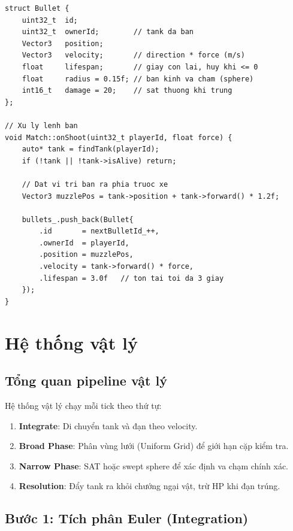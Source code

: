 \documentclass[12pt,a4paper]{report}
\begin{document}
\begin{lstlisting}[style=cppStyle, caption={Bullet entity và khởi tạo khi bắn}, label={lst:bullet}]
struct Bullet {
    uint32_t  id;
    uint32_t  ownerId;        // tank da ban
    Vector3   position;
    Vector3   velocity;       // direction * force (m/s)
    float     lifespan;       // giay con lai, huy khi <= 0
    float     radius = 0.15f; // ban kinh va cham (sphere)
    int16_t   damage = 20;    // sat thuong khi trung
};

// Xu ly lenh ban
void Match::onShoot(uint32_t playerId, float force) {
    auto* tank = findTank(playerId);
    if (!tank || !tank->isAlive) return;

    // Dat vi tri ban ra phia truoc xe
    Vector3 muzzlePos = tank->position + tank->forward() * 1.2f;

    bullets_.push_back(Bullet{
        .id       = nextBulletId_++,
        .ownerId  = playerId,
        .position = muzzlePos,
        .velocity = tank->forward() * force,
        .lifespan = 3.0f   // ton tai toi da 3 giay
    });
}
\end{lstlisting}

\section{Hệ thống vật lý}

\subsection{Tổng quan pipeline vật lý}

Hệ thống vật lý chạy mỗi tick theo thứ tự:

\begin{enumerate}
  \item \textbf{Integrate}: Di chuyển tank và đạn theo velocity.
  \item \textbf{Broad Phase}: Phân vùng lưới (Uniform Grid) để giới hạn cặp kiểm tra.
  \item \textbf{Narrow Phase}: SAT hoặc swept sphere để xác định va chạm chính xác.
  \item \textbf{Resolution}: Đẩy tank ra khỏi chướng ngại vật, trừ HP khi đạn trúng.
\end{enumerate}

\subsection{Bước 1: Tích phân Euler (Integration)}
\end{document}
